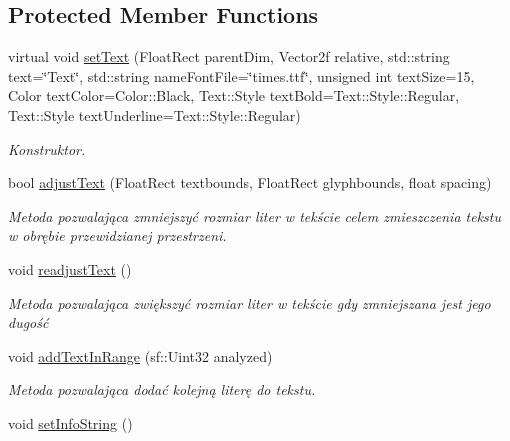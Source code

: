 \subsection*{Protected Member Functions}
\begin{DoxyCompactItemize}
\item 
virtual void \mbox{\hyperlink{class_contain_text_a305522a9f8616b7702f917d72c53e5df}{set\+Text}} (Float\+Rect parent\+Dim, Vector2f relative, std\+::string text=\char`\"{}Text\char`\"{}, std\+::string name\+Font\+File=\char`\"{}times.\+ttf\char`\"{}, unsigned int text\+Size=15, Color text\+Color=Color\+::\+Black, Text\+::\+Style text\+Bold=Text\+::\+Style\+::\+Regular, Text\+::\+Style text\+Underline=Text\+::\+Style\+::\+Regular)
\begin{DoxyCompactList}\small\item\em Konstruktor. \end{DoxyCompactList}\item 
bool \mbox{\hyperlink{class_contain_text_ab1cecc56c7d8bbd543f7f53f552ecac0}{adjust\+Text}} (Float\+Rect textbounds, Float\+Rect glyphbounds, float spacing)
\begin{DoxyCompactList}\small\item\em Metoda pozwalająca zmniejszyć rozmiar liter w tekście celem zmieszczenia tekstu w obrębie przewidzianej przestrzeni. \end{DoxyCompactList}\item 
\mbox{\label{class_contain_text_a356e4b82f7d48db31f5fa694e77e27f9}} 
void \mbox{\hyperlink{class_contain_text_a356e4b82f7d48db31f5fa694e77e27f9}{readjust\+Text}} ()
\begin{DoxyCompactList}\small\item\em Metoda pozwalająca zwiększyć rozmiar liter w tekście gdy zmniejszana jest jego dugość \end{DoxyCompactList}\item 
void \mbox{\hyperlink{class_contain_text_acecaf7e7bd9ada71f74d7db14aee1b8e}{add\+Text\+In\+Range}} (sf\+::\+Uint32 analyzed)
\begin{DoxyCompactList}\small\item\em Metoda pozwalająca dodać kolejną literę do tekstu. \end{DoxyCompactList}\item 
\mbox{\label{class_contain_text_a229f1d48c2dd6d5fc6da65e046aa280d}} 
void \mbox{\hyperlink{class_contain_text_a229f1d48c2dd6d5fc6da65e046aa280d}{set\+Info\+String}} ()

\end{DoxyCompactItemize}
